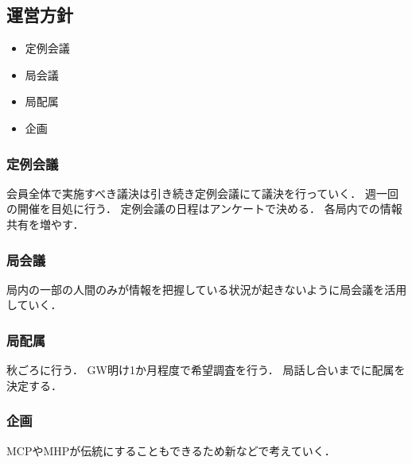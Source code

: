 \subsection*{運営方針}


\begin{itemize}
    \item 定例会議
    \item 局会議
    \item 局配属
    \item 企画
    
  \end{itemize}
  
\subsubsection*{定例会議}
会員全体で実施すべき議決は引き続き定例会議にて議決を行っていく．
週一回の開催を目処に行う．
定例会議の日程はアンケートで決める．
各局内での情報共有を増やす．

\subsubsection*{局会議}
局内の一部の人間のみが情報を把握している状況が起きないように局会議を活用していく．

\subsubsection*{局配属}
秋ごろに行う．
GW明け1か月程度で希望調査を行う．
局話し合いまでに配属を決定する．

\subsubsection*{企画}
MCPやMHPが伝統にすることもできるため新\secondGrade{}などで考えていく．


